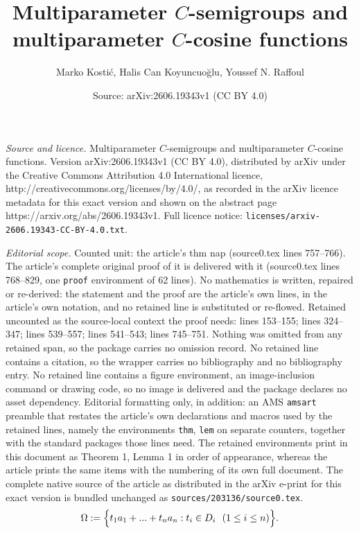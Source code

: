 \documentclass[10pt,a4paper]{amsart}
\title{Multiparameter $C$-semigroups and multiparameter $C$-cosine functions}
\author{Marko Kosti\' c, Halis Can Koyuncuo\u{g}lu, Youssef N. Raffoul}
\date{Source: arXiv:2606.19343v1 (CC BY 4.0)}
\begin{document}
\maketitle

\noindent\emph{Source and licence.} Multiparameter $C$-semigroups and multiparameter $C$-cosine functions. Version arXiv:2606.19343v1 (CC BY 4.0), distributed by arXiv under the Creative Commons Attribution 4.0 International licence, http://creativecommons.org/licenses/by/4.0/, as recorded in the arXiv licence metadata for this exact version and shown on the abstract page https://arxiv.org/abs/2606.19343v1. Full licence notice: \texttt{licenses/arxiv-2606.19343-CC-BY-4.0.txt}.\par\smallskip

\noindent\textit{Editorial scope.} Counted unit: the article's thm nap (source0.tex lines 757--766). The article's complete original proof of it is delivered with it (source0.tex lines 768--829, one \texttt{proof} environment of 62 lines). No mathematics is written, repaired or re-derived: the statement and the proof are the article's own lines, in the article's own notation, and no retained line is substituted or re-flowed.  Retained uncounted as the source-local context the proof needs: lines 153--155; lines 324--347; lines 539--557; lines 541--543; lines 745--751.  Nothing was omitted from any retained span, so the package carries no omission record.  No retained line contains a citation, so the wrapper carries no bibliography and no bibliography entry.  No retained line contains a figure environment, an image-inclusion command or drawing code, so no image is delivered and the package declares no asset dependency.  Editorial formatting only, in addition: an AMS \texttt{amsart} preamble that restates the article's own declarations and macros used by the retained lines, namely the environments \texttt{thm}, \texttt{lem} on separate counters, together with the standard packages those lines need.  The retained environments print in this document as Theorem 1, Lemma 1 in order of appearance, whereas the article prints the same items with the numbering of its own full document.  The complete native source of the article as distributed in the arXiv e-print for this exact version is bundled unchanged as \texttt{sources/203136/source0.tex}.
\begin{align}\label{me1}
\Omega :=\Bigl\{ t_{1}a_{1}+...+t_{n}a_{n} : t_{i}\in D_{i}\ \ (1\leq i\leq n) \Bigr\}.
\end{align}
\end{document}
